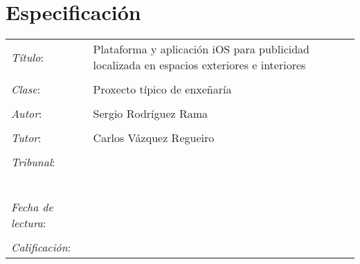 \chapter*{Especificación}

\begin{tabular}{lp{9cm}}
\emph{Título}: & Plataforma y aplicación iOS para publicidad localizada en espacios exteriores e interiores \\
& \\
\emph{Clase}: & Proxecto típico de enxeñaría \\
& \\
\emph{Autor}: &  Sergio Rodríguez Rama \\
& \\
\emph{Tutor}: & Carlos Vázquez Regueiro \\
& \\
\emph{Tribunal}: & \\
& \\
& \\
& \\
& \\
& \\
& \\
\emph{Fecha de lectura}: & \\
& \\
\emph{Calificación}: & \\
\end{tabular}

